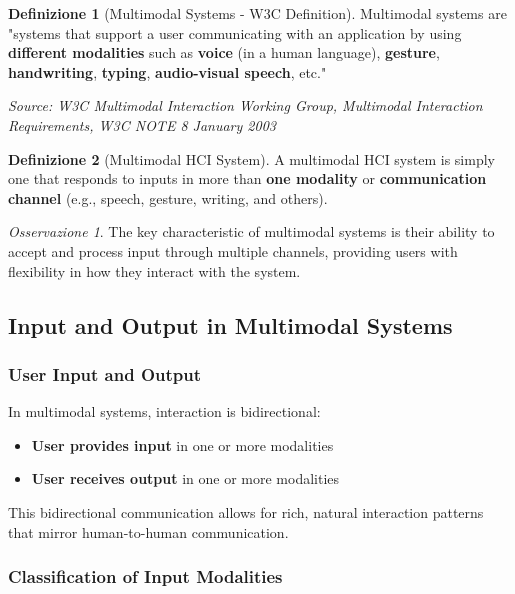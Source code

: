 \documentclass[11pt,a4paper]{article}
\theoremstyle{definition}
\newtheorem{definition}{Definizione}[section]
\theoremstyle{plain}
\theoremstyle{remark}
\newtheorem*{observation}{Osservazione}
\begin{document}
\begin{definition}[Multimodal Systems - W3C Definition]
Multimodal systems are "systems that support a user communicating with an application by using \textbf{different modalities} such as \textbf{voice} (in a human language), \textbf{gesture}, \textbf{handwriting}, \textbf{typing}, \textbf{audio-visual speech}, etc."

\vspace{0.2cm}
\textit{Source: W3C Multimodal Interaction Working Group, Multimodal Interaction Requirements, W3C NOTE 8 January 2003}
\end{definition}

\begin{definition}[Multimodal HCI System]
A multimodal HCI system is simply one that responds to inputs in more than \textbf{one modality} or \textbf{communication channel} (e.g., speech, gesture, writing, and others).
\end{definition}

\begin{observation}
The key characteristic of multimodal systems is their ability to accept and process input through multiple channels, providing users with flexibility in how they interact with the system.
\end{observation}

\subsection{Input and Output in Multimodal Systems}

\subsubsection{User Input and Output}

In multimodal systems, interaction is bidirectional:

\begin{itemize}
    \item \textbf{User provides input} in one or more modalities
    \item \textbf{User receives output} in one or more modalities
\end{itemize}

This bidirectional communication allows for rich, natural interaction patterns that mirror human-to-human communication.

\subsubsection{Classification of Input Modalities}
\end{document}
